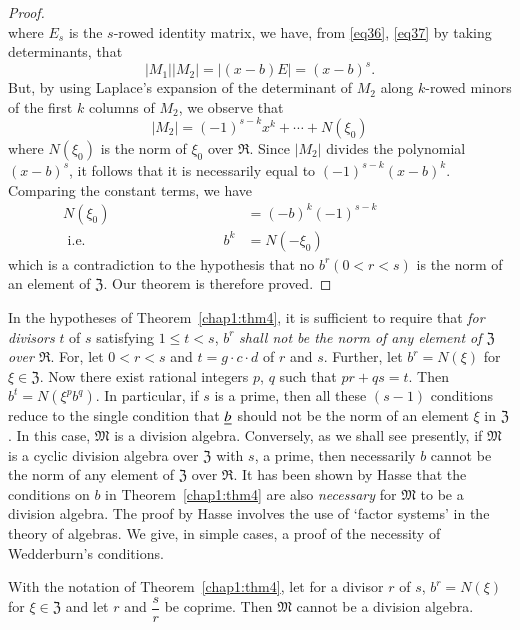 \begin{proof}
$$$$
where $E_s$ is the $s$-rowed identity matrix, we have, from \eqref{eq36}, \eqref{eq37}
by taking determinants, that
$$
|M_1||M_2| = |(x-b)E| = (x-b)^s.
$$
But, by using Laplace's expansion of the determinant of $M_2$ along
$k$-rowed minors of the first $k$ columns of $M_2$, we observe that
$$
|M_2| = (-1)^{s-k} x^k + \cdots + N (\xi_0)
$$
where $N(\xi_0)$ is the norm of $\xi_0$ over $\mathfrak{R}$. Since
$|M_2|$ divides the polynomial \pageoriginale $(x-b)^s$, it follows
that it is necessarily equal to $(-1)^{s-k} (x-b)^k$. Comparing the
constant terms, we have
\begin{align*}
N (\xi_0) & = (-b)^k (-1)^{s-k}\\
\text{ i.e. } \hspace{4cm} b^k & = N (-\xi_0)\hspace{4cm}
\end{align*}
which is a contradiction to the hypothesis that no $b^r(0<r<s)$ is the
norm of an element of $\mathfrak{Z}$. Our theorem is therefore proved.
\end{proof}

\begin{rem}\label{rem1}
In the hypotheses of Theorem~\ref{chap1:thm4}, it is sufficient to require that {\em
  for divisors} $t$ of $s$ satisfying $1\leq t < s$, $b^r$ {\em shall
  not be the norm of any element of $\mathfrak{Z}$ over
  $\mathfrak{R}$}. For, let $0< r < s$ and $t=g\cdot c\cdot d$ of $r$
and $s$. Further, let $b^r = N (\xi)$ for $\xi \in \mathfrak{Z}$. Now
there exist rational integers $p$, $q$ such that $pr + qs = t$. Then
$b^t = N (\xi^p b^q)$. In particular, if $s$ is a prime, then all
these $(s-1)$ conditions reduce to the single condition that $\underline{b}$
should not be the norm of an element $\xi$ in $\mathfrak{Z}$. In this
case, $\mathfrak{M}$ is a division algebra. Conversely, as we shall
see presently, if $\mathfrak{M}$ is a cyclic division algebra over
$\mathfrak{Z}$ with $s$, a prime, then necessarily $b$ cannot be the
norm of any element of $\mathfrak{Z}$ over $\mathfrak{R}$. It has been
shown by Hasse \cite{9} that the conditions on $b$ in Theorem~\ref{chap1:thm4} are
also {\em necessary} for $\mathfrak{M}$ to be a division algebra. The
proof by Hasse involves the use of `factor systems' in the theory of
algebras. We give, in simple cases, a proof of the necessity of
Wedderburn's conditions.
\end{rem}

\begin{proposition}
With the notation of Theorem~\ref{chap1:thm4}, let for a divisor $r$ of $s$, $b^r= N
(\xi)$ for $\xi \in \mathfrak{Z}$ and let $r$ and $\dfrac{s}{r}$
be coprime. Then $\mathfrak{M}$ cannot be a division algebra.
\end{proposition}

